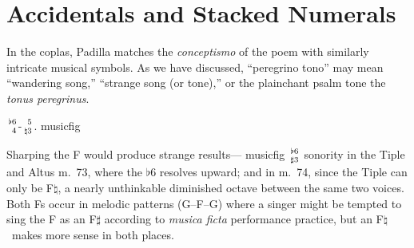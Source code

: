 \documentclass[12pt]{article}
\newcommand{\fl}{$\flat$} %
\newcommand{\sh}{$\sharp$}
\newcommand{\na}{$\natural$}
\newcommand{\musicfig}[2]{$\genfrac{}{}{0pt}{1}{\text{#1}}{\text{#2}}$}
\newcommand{\blankfig}{\hphantom{$\sharp$}}
\begin{document}
\section{%
Accidentals and Stacked Numerals
}

In the coplas, Padilla matches the \emph{conceptismo} of the poem with similarly intricate musical symbols.
As we have discussed, ``peregrino tono'' may mean ``wandering song,'' ``strange song (or tone),'' or the plainchant psalm tone the \emph{tonus peregrinus}.

\musicfig{\fl6}{\blankfig4}-\musicfig{\blankfig5}{\na3}. musicfig

Sharping the F would produce strange results---
musicfig \musicfig{\fl6}{\sh3} sonority 
in the Tiple and Altus m.~73, where the \fl6 resolves upward; and in m.~74, since the Tiple can only be F\na, a nearly unthinkable diminished octave between the same two voices. 
Both Fs occur in melodic patterns (G--F--G) where a singer might be tempted to sing the F as an F\sh{} according to \emph{musica ficta} performance practice, but an F\na\ makes more sense in both places.
\end{document}
